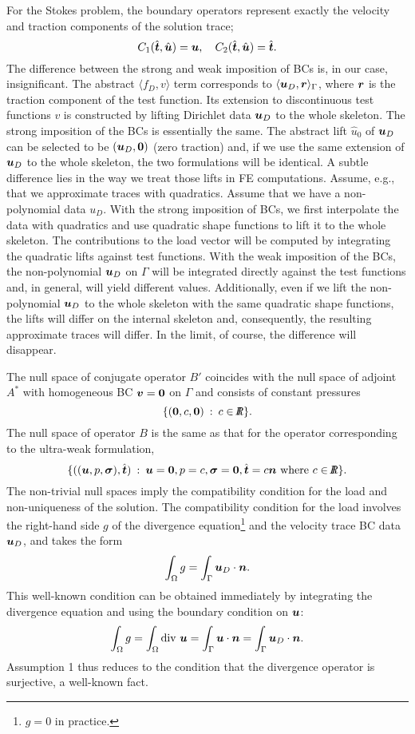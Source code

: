 For the Stokes problem, the boundary operators represent exactly the velocity and traction components
of the solution trace;
\[
C_1 (\hat{\bft},\hat{\bfu}) = \bfu,\quad C_2 (\hat{\bft},\hat{\bfu}) = \hat{\bft}.
\]
{
The difference between the strong and weak imposition of BCs is, in our case, insignificant.
The abstract $\langle f_D,v \rangle$ term corresponds to $\langle\bfu_D,\bfr\rangle_\Gamma$,
where $\bfr$ is the traction component of the test function.
Its extension to discontinuous test functions $v$ is constructed by lifting Dirichlet data $\bfu_D$ to the
whole skeleton. The strong imposition of the BCs is essentially the same. The abstract lift $\hat{u}_0$
of $\bfu_D$ can be selected to be $(\bfu_D,{\bf 0})$ (zero traction) and, if we use the same extension
of $\bfu_D$ to the whole skeleton, the two formulations will be identical. A subtle difference
lies in the way we treat those lifts in FE computations. Assume, e.g., that we approximate
traces with quadratics.
Assume that we have a non-polynomial
data $u_D$. With the strong imposition of BCs, we first interpolate the data with quadratics
and use quadratic shape functions to lift it to the whole skeleton. The contributions
to the load vector will be computed by integrating the quadratic lifts against test functions.
With the weak imposition of the BCs, the non-polynomial $\bfu_D$ on $\Gamma$
will be integrated directly against the test functions and, in general, will yield different
values. Additionally, 
even if we lift the non-polynomial $\bfu_D$ to the whole skeleton
with the same quadratic shape functions, the lifts will differ on the internal skeleton and,
consequently, the resulting approximate traces will differ. In the limit, of course,
the difference will disappear.}



The null space of conjugate operator $B'$ coincides with the null space of adjoint $A^\ast$ with homogeneous
BC $\bfv = {\bf 0}$ on $\Gamma$ and consists of constant pressures
\[
\{ ({\bf 0},c,{\bf 0}) \: : \: c \in \doubleIR \}.
\]
The null space of operator $B$ is the same as that for the operator corresponding to the
ultra-weak formulation,
\[
\{ ((\bfu,p,\bfsig),\hat{\bft}) \: : \: \bfu = {\bf 0}, p = c , \bfsig = {\bf 0}, \hat{\bft} = c \bfn 
\text{ where } c \in \doubleIR \}.
\]
The non-trivial null spaces imply the compatibility condition for the load and non-uniqueness of the solution.
The compatibility condition for the load involves the right-hand side $g$
of the divergence equation\footnote{$g=0$ in practice.} and
the velocity trace BC data $\bfu_D$, and takes the form 
\[
\int_\Omega g = \int_{\Gamma} \bfu_D \cdot \bfn.
\]
This well-known condition can be obtained immediately by integrating the divergence equation
and using the boundary condition on $\bfu$:
\[
\int_\Omega g = \int_\Omega \text{div } \bfu = \int_\Gamma \bfu \cdot \bfn = \int_\Gamma \bfu_D \cdot \bfn.
\]
Assumption 1 thus reduces to the condition that the divergence operator is surjective, a well-known
fact.

